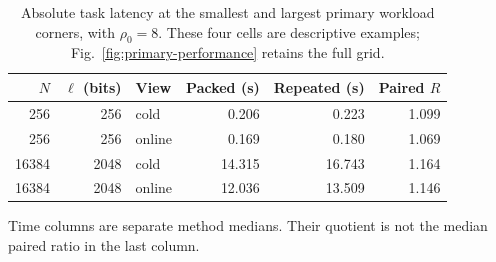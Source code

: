 \begin{table}[tbp]
\centering\small
\caption{Absolute task latency at the smallest and largest primary workload corners, with $\rho_0=8$. These four cells are descriptive examples; Fig.~\ref{fig:primary-performance} retains the full grid.}
\label{tab:absolute}
\setlength{\tabcolsep}{4pt}
\begin{tabular}{@{}rrlrrr@{}}
\toprule
$N$ & $\ell$ (bits) & View & Packed (s) & Repeated (s) & Paired $R$ \\
\midrule
256 & 256 & cold & 0.206 & 0.223 & 1.099 \\
256 & 256 & online & 0.169 & 0.180 & 1.069 \\
16384 & 2048 & cold & 14.315 & 16.743 & 1.164 \\
16384 & 2048 & online & 12.036 & 13.509 & 1.146 \\
\bottomrule\end{tabular}
\par\smallskip\begin{minipage}{\linewidth}\footnotesize Time columns are separate method medians. Their quotient is not the median paired ratio in the last column.\end{minipage}
\end{table}
